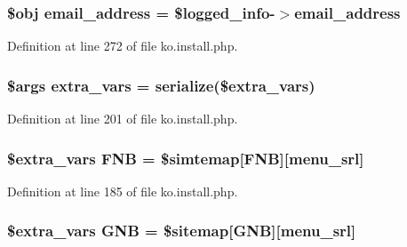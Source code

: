 \subsubsection[{email\+\_\+address}]{\setlength{\rightskip}{0pt plus 5cm}\$obj email\+\_\+address = \$logged\+\_\+info-\/$>$email\+\_\+address}\label{ko_8install_8php_a1dffea0d5ba8194f8ef01f414af0c831}


Definition at line 272 of file ko.\+install.\+php.

\hypertarget{ko_8install_8php_ae1dcb37fc34a8f312d2e6abd6f806743}{}
\subsubsection[{extra\+\_\+vars}]{\setlength{\rightskip}{0pt plus 5cm}\$args extra\+\_\+vars = serialize(\$extra\+\_\+vars)}\label{ko_8install_8php_ae1dcb37fc34a8f312d2e6abd6f806743}


Definition at line 201 of file ko.\+install.\+php.

\hypertarget{ko_8install_8php_a683e060c22be3e658be6f9751a2082f0}{}
\subsubsection[{F\+N\+B}]{\setlength{\rightskip}{0pt plus 5cm}\${\bf extra\+\_\+vars} F\+N\+B = \$simtemap\mbox{[}\textquotesingle{}F\+N\+B\textquotesingle{}\mbox{]}\mbox{[}\textquotesingle{}menu\+\_\+srl\textquotesingle{}\mbox{]}}\label{ko_8install_8php_a683e060c22be3e658be6f9751a2082f0}


Definition at line 185 of file ko.\+install.\+php.

\hypertarget{ko_8install_8php_a9b1716b68fc04f3492448f38148dcbf5}{}
\subsubsection[{G\+N\+B}]{\setlength{\rightskip}{0pt plus 5cm}\${\bf extra\+\_\+vars} G\+N\+B = \$sitemap\mbox{[}\textquotesingle{}G\+N\+B\textquotesingle{}\mbox{]}\mbox{[}\textquotesingle{}menu\+\_\+srl\textquotesingle{}\mbox{]}}\label{ko_8install_8php_a9b1716b68fc04f3492448f38148dcbf5}


